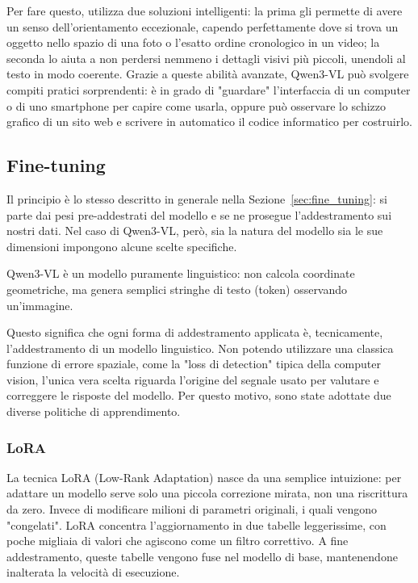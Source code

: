 \noindent
Per fare questo, utilizza due soluzioni intelligenti: la prima gli permette di avere un senso dell'orientamento eccezionale, capendo perfettamente dove si trova un oggetto nello spazio di una foto o l'esatto ordine cronologico in un video;
la seconda lo aiuta a non perdersi nemmeno i dettagli visivi più piccoli, unendoli al testo in modo coerente.
Grazie a queste abilità avanzate, Qwen3-VL può svolgere compiti pratici sorprendenti: è in grado di "guardare" l'interfaccia di un computer o di uno smartphone per capire come usarla,
oppure può osservare lo schizzo grafico di un sito web e scrivere in automatico il codice informatico per costruirlo. \cite{ollama_qwen} \cite{lmstudio_qwen}

\subsection{Fine-tuning}

Il principio è lo stesso descritto in generale nella Sezione~\ref{sec:fine_tuning}: si parte dai pesi pre-addestrati del modello e se ne prosegue l'addestramento sui nostri dati.
Nel caso di Qwen3-VL, però, sia la natura del modello sia le sue dimensioni impongono alcune scelte specifiche.

Qwen3-VL è un modello puramente linguistico: non calcola coordinate geometriche, ma genera semplici stringhe di testo (token) osservando un'immagine.

\noindent
Questo significa che ogni forma di addestramento applicata è, tecnicamente, l'addestramento di un modello linguistico. Non potendo utilizzare una classica funzione di errore spaziale, come la "loss di detection"
tipica della computer vision, l'unica vera scelta riguarda l'origine del segnale usato per valutare e correggere le risposte del modello. Per questo motivo, sono state adottate due diverse politiche di apprendimento.

\subsubsection{LoRA}
\label{sec:lora}

\noindent
La tecnica LoRA (Low-Rank Adaptation) nasce da una semplice intuizione: per adattare un modello serve solo una piccola correzione mirata, non una riscrittura da zero.
Invece di modificare milioni di parametri originali, i quali vengono "congelati". LoRA concentra l'aggiornamento in due tabelle leggerissime, con poche migliaia di valori che agiscono come un filtro correttivo.
A fine addestramento, queste tabelle vengono fuse nel modello di base, mantenendone inalterata la velocità di esecuzione.

